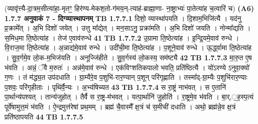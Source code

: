 \documentclass[17pt]{extarticle}
\begin{document}
                  \newline
                                    (व्यावृ॑त्त्यै-दा॒त्रम॒सीत्या॑हा॒-मृतꣳ॒॒ हिर॑ण्य-मेकश॒तो-ग॑मय॒न्-त्याह॑-ब्राह्मा॒णा-
ना॒ष्ट्राभ्यः॑ पा॒तेत्या॑ह च॒त्वारि॑ च) \textbf{(A6)} \newline \newline
                \textbf{ 1.7.7     अनुवाकं   7 - दिग्व्यास्थापनम्} \newline
                                \textbf{ TB 1.7.7.1} \newline
                  दिशो॒ व्यास्था॑पयति । दि॒शाम॒भिजि॑त्यै । यद॑नु प्र॒क्रामे᳚त् । अ॒भि दिशो॑ जयेत् । उत्तु मा᳚द्येत् । मन॒साऽनु॒ प्रक्रा॑मति । अ॒भि दिशो॑ जयति । नोन्मा᳚द्यति । स॒मिध॒मा ति॒ष्ठेत्या॑ह । तेज॑ ए॒वाव॑रुन्धे \textbf{ 41} \newline
                  \newline
                                \textbf{ TB 1.7.7.2} \newline
                  उ॒ग्रामा ति॒ष्ठेत्या॑ह । इ॒न्द्रि॒यमे॒वाव॑ रुन्धे । वि॒राज॒मा ति॒ष्ठेत्या॑ह । अ॒न्नाद्य॑मे॒वाव॑ रुन्धे । उदी॑ची॒मा ति॒ष्ठेत्या॑ह । प॒शूने॒वाव॑ रुन्धे । ऊ॒र्द्ध्वामा ति॒ष्ठेत्या॑ह । सु॒व॒र्गमे॒व लो॒क-म॒भिज॑यति । अनूज्जि॑हीते । सु॒व॒र्गस्य॑ लो॒कस्य॒ सम॑ष्ट्यै \textbf{ 42} \newline
                  \newline
                                \textbf{ TB 1.7.7.3} \newline
                  मा॒रु॒त ए॒ष भ॑वति । अन्नं॒ ॅवै म॒रुतः॑ । अन्न॑मे॒वाव॑ रुन्धे । एक॑विꣳशतिकपालो भवति॒ प्रति॑ष्ठित्यै । यो॑ऽरण्ये ऽनुवा॒क्यो॑ ग॒णः । तं म॑द्ध्य॒त उप॑दधाति । ग्रा॒म्यैरे॒व प॒शुभि॑-रार॒ण्यान् प॒शून् परि॑गृह्णाति । तस्मा᳚द्-ग्रा॒म्यैः प॒शुभि॑रार॒ण्याः प॒शवः॒ परि॑गृहीताः । पृथि॑र्वै॒न्यः । अ॒भ्य॑षिच्यत \textbf{ 43} \newline
                  \newline
                                \textbf{ TB 1.7.7.4} \newline
                  स रा॒ष्ट्रं नाभ॑वत् । स ए॒तानि॑ पा॒र्थान्य॑पश्यत् । तान्य॑जुहोत् । तैर्वै स रा॒ष्ट्र-म॑भवत् । यत्पा॒र्थानि॑ जु॒होति॑ । रा॒ष्ट्रमे॒व भ॑वति । बा॒र्.॒ह॒स्प॒त्यं पूर्वे॑षामुत्त॒मं भ॑वति । ऐ॒न्द्रमुत्त॑रेषां प्रथ॒मम् । ब्रह्म॑ चै॒वास्मै᳚ क्ष॒त्रं च॑ स॒मीची॑ दधाति । अथो॒ ब्रह्म॑न्ने॒व क्ष॒त्रं प्रति॑ष्ठापयति \textbf{ 44} \newline
                  \newline
                                \textbf{ TB 1.7.7.5} \newline
\end{document}
